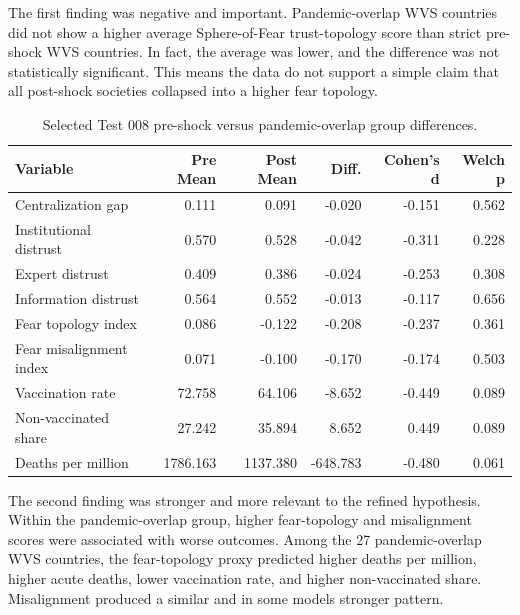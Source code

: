\documentclass[12pt]{article}
\begin{document}
The first finding was negative and important. Pandemic-overlap WVS countries did not show a higher average Sphere-of-Fear trust-topology score than strict pre-shock WVS countries. In fact, the average was lower, and the difference was not statistically significant. This means the data do not support a simple claim that all post-shock societies collapsed into a higher fear topology.

\begin{table}[htbp]
\centering
\small
\caption{Selected Test 008 pre-shock versus pandemic-overlap group differences.}
\begin{tabular}{lrrrrr}
\toprule
Variable & Pre Mean & Post Mean & Diff. & Cohen's d & Welch p \\
\midrule
Centralization gap & 0.111 & 0.091 & -0.020 & -0.151 & 0.562 \\
Institutional distrust & 0.570 & 0.528 & -0.042 & -0.311 & 0.228 \\
Expert distrust & 0.409 & 0.386 & -0.024 & -0.253 & 0.308 \\
Information distrust & 0.564 & 0.552 & -0.013 & -0.117 & 0.656 \\
Fear topology index & 0.086 & -0.122 & -0.208 & -0.237 & 0.361 \\
Fear misalignment index & 0.071 & -0.100 & -0.170 & -0.174 & 0.503 \\
Vaccination rate & 72.758 & 64.106 & -8.652 & -0.449 & 0.089 \\
Non-vaccinated share & 27.242 & 35.894 & 8.652 & 0.449 & 0.089 \\
Deaths per million & 1786.163 & 1137.380 & -648.783 & -0.480 & 0.061 \\
\bottomrule
\end{tabular}
\end{table}

The second finding was stronger and more relevant to the refined hypothesis. Within the pandemic-overlap group, higher fear-topology and misalignment scores were associated with worse outcomes. Among the 27 pandemic-overlap WVS countries, the fear-topology proxy predicted higher deaths per million, higher acute deaths, lower vaccination rate, and higher non-vaccinated share. Misalignment produced a similar and in some models stronger pattern.
\end{document}

